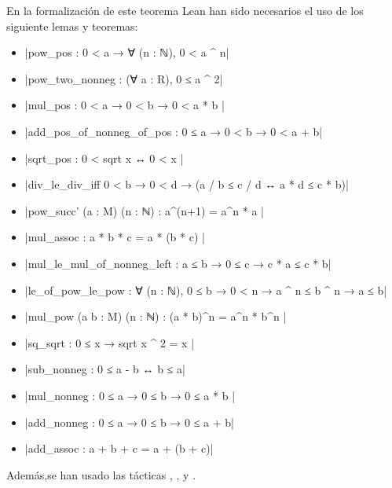 En la formalización de este teorema Lean han sido necesarios el uso
de los siguiente lemas y teoremas:
\begin{itemize}
\item {}|pow_pos : 0 < a → ∀ (n : ℕ), 0 < a ^ n|
\item {}|pow_two_nonneg : (∀ a : R), 0 ≤ a ^ 2|
\item {}|mul_pos : 0 < a → 0 < b → 0 < a * b |
\item {}|add_pos_of_nonneg_of_pos : 0 ≤ a → 0 < b → 0 < a + b|
\item {}|sqrt_pos : 0 < sqrt x ↔ 0 < x |
\item {}|div_le_div_iff 0 < b → 0 < d → (a / b ≤ c / d ↔ a * d ≤ c * b)|
\item {}|pow_succ' (a : M) (n : ℕ) : a^(n+1) = a^n * a |
\item {}|mul_assoc : a * b * c = a * (b * c) |
\item {}|mul_le_mul_of_nonneg_left : a ≤ b → 0 ≤ c → c * a ≤ c * b|
\item {}|le_of_pow_le_pow : ∀ (n : ℕ), 0 ≤ b → 0 < n → a ^ n ≤ b ^ n → a ≤ b|
\item {}|mul_pow (a b : M) (n : ℕ) : (a * b)^n = a^n * b^n |
\item {}|sq_sqrt : 0 ≤ x → sqrt x ^ 2 = x |
\item {}|sub_nonneg : 0 ≤ a - b ↔ b ≤ a|
\item {}|mul_nonneg : 0 ≤ a → 0 ≤ b → 0 ≤ a * b |
\item {}|add_nonneg : 0 ≤ a → 0 ≤ b → 0 ≤ a + b|
\item {}|add_assoc : a + b + c = a + (b + c)|
\end{itemize}

Además,se han usado las tácticas
,
,
 y
.

